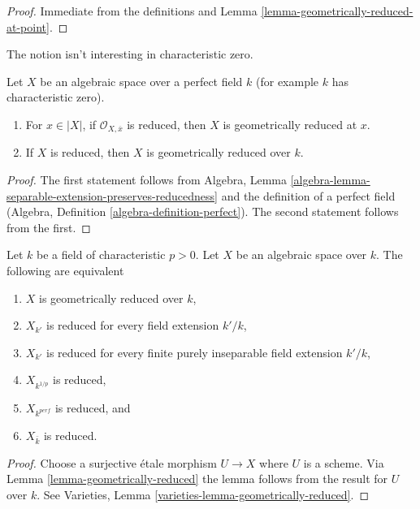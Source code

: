 \begin{proof}
Immediate from the definitions and
Lemma \ref{lemma-geometrically-reduced-at-point}.
\end{proof}

\noindent
The notion isn't interesting in characteristic zero.

\begin{lemma}
\label{lemma-perfect-reduced}
Let $X$ be an algebraic space over a perfect field $k$ (for example
$k$ has characteristic zero).
\begin{enumerate}
\item For $x \in |X|$, if $\mathcal{O}_{X, \overline{x}}$ is
reduced, then $X$ is geometrically reduced at $x$.
\item If $X$ is reduced, then $X$ is geometrically reduced over $k$.
\end{enumerate}
\end{lemma}

\begin{proof}
The first statement follows from
Algebra, Lemma \ref{algebra-lemma-separable-extension-preserves-reducedness}
and the definition of a perfect field
(Algebra, Definition \ref{algebra-definition-perfect}).
The second statement follows from the first.
\end{proof}

\begin{lemma}
\label{lemma-geometrically-reduced-positive-characteristic}
Let $k$ be a field of characteristic $p > 0$. Let $X$ be an algebraic space
over $k$. The following are equivalent
\begin{enumerate}
\item $X$ is geometrically reduced over $k$,
\item $X_{k'}$ is reduced for every field extension $k'/k$,
\item $X_{k'}$ is reduced for every
finite purely inseparable field extension $k'/k$,
\item $X_{k^{1/p}}$ is reduced,
\item $X_{k^{perf}}$ is reduced, and
\item $X_{\bar k}$ is reduced.
\end{enumerate}
\end{lemma}

\begin{proof}
Choose a surjective \'etale morphism $U \to X$ where $U$ is a scheme.
Via Lemma \ref{lemma-geometrically-reduced} the lemma follows from
the result for $U$ over $k$.
See Varieties, Lemma \ref{varieties-lemma-geometrically-reduced}.
\end{proof}

